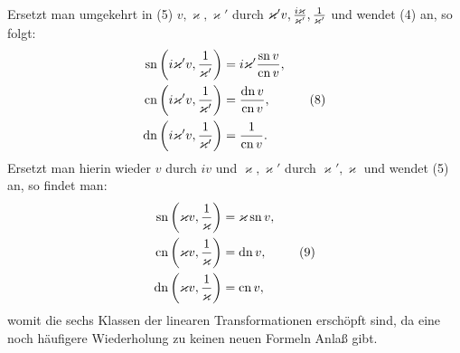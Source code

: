 \documentclass[11pt]{article}
\providecommand{\sn}{\operatorname{sn}}
\providecommand{\cn}{\operatorname{cn}}
\providecommand{\dn}{\operatorname{dn}}
\begin{document}
Ersetzt man umgekehrt in (5) $v,\varkappa,\varkappa'$ durch $\varkappa'v,{i\varkappa\over\varkappa'},{1\over\varkappa'}$ und wendet (4) an, so folgt:
\begin{equation}
\begin{aligned}
\sn\left(i\varkappa'v,{1\over\varkappa'}\right)&=i\varkappa'{\sn v\over\cn v},\\
\cn\left(i\varkappa'v,{1\over\varkappa'}\right)&={\dn v\over\cn v},\\
\dn\left(i\varkappa'v,{1\over\varkappa'}\right)&={1\over\cn v}.
\end{aligned}
\tag{8}
\end{equation}
Ersetzt man hierin wieder $v$ durch $iv$ und $\varkappa,\varkappa'$ durch $\varkappa',\varkappa$ und wendet (5) an, so findet man:
\begin{equation}
\begin{aligned}
\sn\left(\varkappa v,{1\over\varkappa}\right)&=\varkappa\sn v,\\
\cn\left(\varkappa v,{1\over\varkappa}\right)&=\dn v,\\
\dn\left(\varkappa v,{1\over\varkappa}\right)&=\cn v,
\end{aligned}
\tag{9}
\end{equation}
womit die sechs Klassen der linearen Transformationen erschöpft sind, da eine noch häufigere Wiederholung zu keinen neuen Formeln Anlaß gibt.
\end{document}
